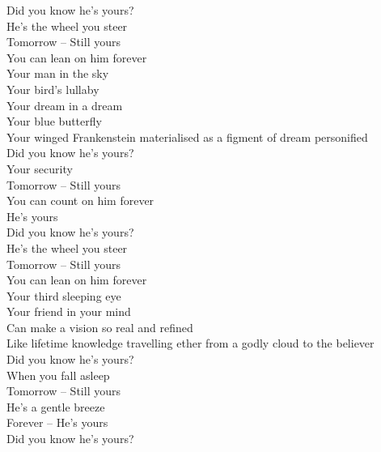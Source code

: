 \label{album:butterfly-3000}




Did you know he's yours? \\
He's the wheel you steer \\
Tomorrow -- Still yours \\
You can lean on him forever \\

Your man in the sky \\
Your bird's lullaby \\
Your dream in a dream \\
Your blue butterfly \\
Your winged Frankenstein materialised as a figment of dream personified \\

Did you know he's yours? \\
Your security \\
Tomorrow -- Still yours \\
You can count on him forever \\
He's yours \\

Did you know he's yours? \\
He's the wheel you steer \\
Tomorrow -- Still yours \\
You can lean on him forever \\

Your third sleeping eye \\
Your friend in your mind \\
Can make a vision so real and refined \\
Like lifetime knowledge travelling ether from a godly cloud to the believer \\

Did you know he's yours? \\
When you fall asleep \\
Tomorrow -- Still yours \\
He's a gentle breeze \\
Forever -- He's yours \\

Did you know he's yours? \\

